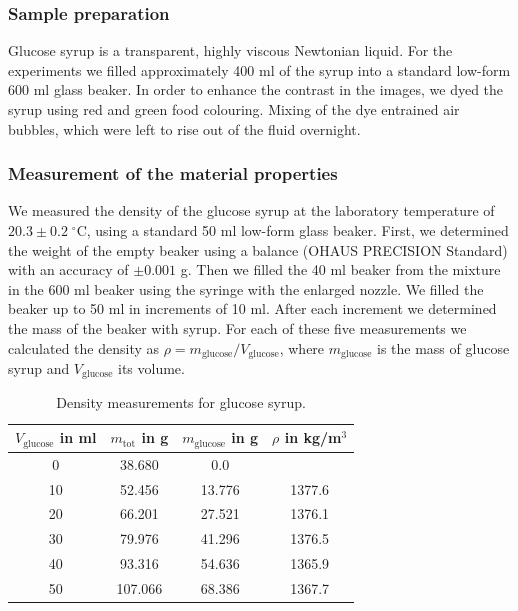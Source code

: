 \documentclass[aip,graphicx]{revtex4-1}
\newcommand{\sym}[1]{\text{#1}}
\newcommand{\degCpm}[2]{#1 \pm #2 \; ^{\circ} \text{C}}
\begin{document}

\subsubsection{Sample preparation}

Glucose syrup is a transparent, highly viscous Newtonian liquid.
For the experiments we filled approximately 400 ml of the syrup into a standard low-form 600 ml glass beaker. 
In order to enhance the contrast in the images, we dyed the syrup using red and green food colouring. 
Mixing of the dye entrained air bubbles, which were left to rise out of the fluid overnight.

\subsubsection{Measurement of the material properties}

We measured the density of the glucose syrup at the laboratory temperature of $\degCpm{20.3}{0.2}$, using a standard 50 ml low-form glass beaker. 
First, we determined the weight of the empty beaker using a balance (OHAUS PRECISION Standard) with an accuracy of $\pm 0.001$ g. 
Then we filled the 40 ml beaker from the mixture in the 600 ml beaker using the syringe with the enlarged nozzle. 
We filled the beaker up to 50 ml in increments of 10 ml. 
After each increment we determined the mass of the beaker with syrup. 
For each of these five measurements we calculated the density as $\rho=m_{\sym{glucose}}/V_{\sym{glucose}}$, where $m_{\sym{glucose}}$ is the mass of glucose syrup and $V_{\sym{glucose}}$ its volume.

{\renewcommand{\arraystretch}{1.2}
 \begin{table}[!ht]
 \begin{center}
 \begin{tabular}{c | c | c | c}
  $V_{\sym{glucose}}$ in ml & $m_{\sym{tot}}$ in g & $m_{\sym{glucose}}$ in g & $\rho$ in kg/m$^3$ \\ 
   \hline
   0 & 38.680 & 0.0 &  \\
   10 & 52.456 & 13.776 & 1377.6 \\
   20 & 66.201 & 27.521 & 1376.1 \\
   30 & 79.976 & 41.296 & 1376.5\\
   40 & 93.316 & 54.636 & 1365.9 \\
   50 & 107.066 & 68.386 & 1367.7
 \end{tabular}
 \caption{Density measurements for glucose syrup.}
 \label{tab:glucose_density}
 \end{center}
 \end{table}}
\end{document}
